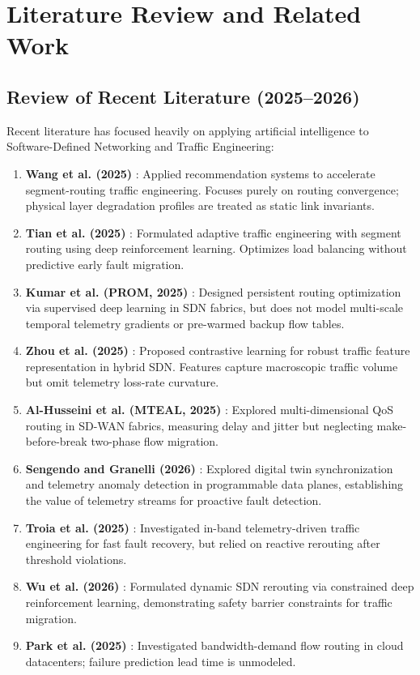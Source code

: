 \documentclass[11pt,a4paper]{report}
\begin{document}
\chapter{Literature Review and Related Work}

\section{Review of Recent Literature (2025--2026)}
Recent literature has focused heavily on applying artificial intelligence to Software-Defined Networking and Traffic Engineering:
\begin{enumerate}
    \item \textbf{Wang et al. (2025)} \cite{wang2025accelerating}: Applied recommendation systems to accelerate segment-routing traffic engineering. Focuses purely on routing convergence; physical layer degradation profiles are treated as static link invariants.
    \item \textbf{Tian et al. (2025)} \cite{tian2025adaptive}: Formulated adaptive traffic engineering with segment routing using deep reinforcement learning. Optimizes load balancing without predictive early fault migration.
    \item \textbf{Kumar et al. (PROM, 2025)} \cite{kumar2025prom}: Designed persistent routing optimization via supervised deep learning in SDN fabrics, but does not model multi-scale temporal telemetry gradients or pre-warmed backup flow tables.
    \item \textbf{Zhou et al. (2025)} \cite{zhou2025contrastive}: Proposed contrastive learning for robust traffic feature representation in hybrid SDN. Features capture macroscopic traffic volume but omit telemetry loss-rate curvature.
    \item \textbf{Al-Husseini et al. (MTEAL, 2025)} \cite{alhusseini2025mteal}: Explored multi-dimensional QoS routing in SD-WAN fabrics, measuring delay and jitter but neglecting make-before-break two-phase flow migration.
    \item \textbf{Sengendo and Granelli (2026)} \cite{sengendo2026digital}: Explored digital twin synchronization and telemetry anomaly detection in programmable data planes, establishing the value of telemetry streams for proactive fault detection.
    \item \textbf{Troia et al. (2025)} \cite{troia2025inband}: Investigated in-band telemetry-driven traffic engineering for fast fault recovery, but relied on reactive rerouting after threshold violations.
    \item \textbf{Wu et al. (2026)} \cite{wu2026dynamic}: Formulated dynamic SDN rerouting via constrained deep reinforcement learning, demonstrating safety barrier constraints for traffic migration.
    \item \textbf{Park et al. (2025)} \cite{park2025deep}: Investigated bandwidth-demand flow routing in cloud datacenters; failure prediction lead time is unmodeled.
\end{enumerate}
\end{document}
